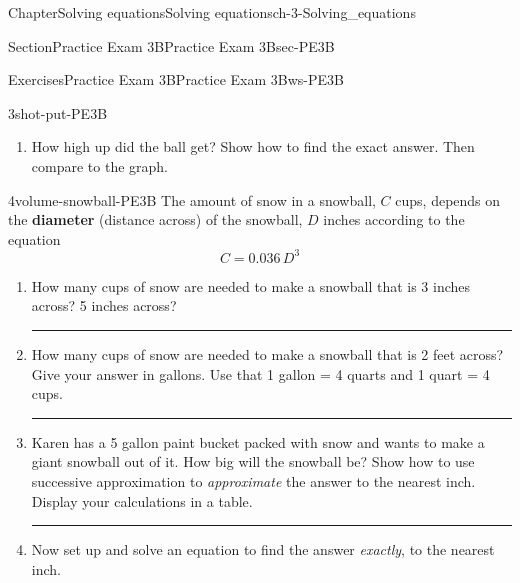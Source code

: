 \documentclass[twoside,11pt,]{book}
\newcommand{\terminology}[1]{\textbf{#1}}
\newlength{\workspacestrutwidth}
\numberwithin{equation}{section}
\begin{document}
\begin{chapterptx}{Chapter}{Solving equations}{}{Solving equations}{}{}{ch-3-Solving_equations}
\begin{sectionptx}{Section}{Practice Exam 3B}{}{Practice Exam 3B}{}{}{sec-PE3B}
\begin{exercises-subsection-numberless}{Exercises}{Practice Exam 3B}{}{Practice Exam 3B}{}{}{ws-PE3B}
\begin{divisionexercise}{3}{}{}{shot-put-PE3B}
\begin{enumerate}[label=(\alph*),ref=\alph*]
\par\rule{\workspacestrutwidth}{2.5in}%
\item{}How high up did the ball get? Show how to find the exact answer. Then compare to the graph.%
\end{enumerate}%
\end{divisionexercise}%
\clearpage
\begin{divisionexercise}{4}{}{}{volume-snowball-PE3B}%
The amount of snow in a snowball, \(C\) cups, depends on the \terminology{diameter} (distance across) of the snowball, \(D\) inches according to the equation%
\begin{equation*}
C = 0.036\, D^3
\end{equation*}
%
\begin{enumerate}[label=(\alph*),ref=\alph*]%
\item{}How many cups of snow are needed to make a snowball that is 3 inches across? 5 inches across?%
\par\rule{\workspacestrutwidth}{1in}%
\item{}How many cups of snow are needed to make a snowball that is 2 feet across? Give your answer in gallons. Use that 1 gallon = 4 quarts and 1 quart = 4 cups.%
\par\rule{\workspacestrutwidth}{1in}%
\item{}Karen has a 5 gallon paint bucket packed with snow and wants to make a giant snowball out of it. How big will the snowball be? Show how to use successive approximation to \emph{approximate} the answer to the nearest inch. Display your calculations in a table.%
\par\rule{\workspacestrutwidth}{1.5in}%
\item{}Now set up and solve an equation to find the answer \emph{exactly}, to the nearest inch.%
\end{enumerate}%
\end{divisionexercise}%
\end{exercises-subsection-numberless}
\end{sectionptx}
\end{chapterptx}
%
%
\typeout{************************************************}
\typeout{************************************************}
%
\end{document}

